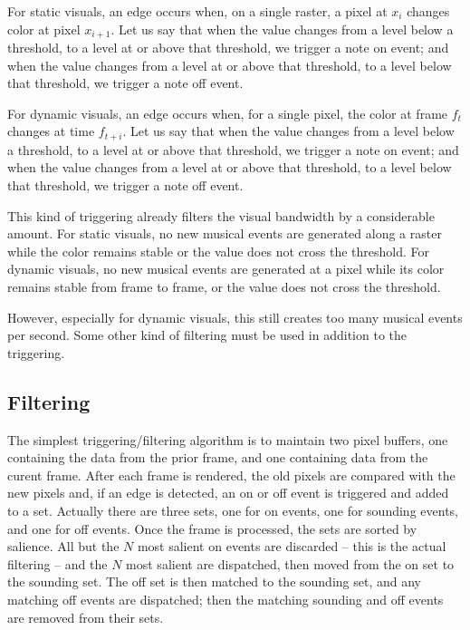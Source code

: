 \documentclass[english,11pt,letterpaper,onecolumn]{scrartcl}
\begin{document}
For static visuals, an edge occurs when, on a single raster, a pixel at 
$x_{i}$ changes color at pixel $x_{i + 1}$. Let us say that when the value 
changes from a level below a threshold, to a level at or above that threshold, 
we trigger a note on event; and when the value changes from a level at or 
above that threshold, to a level below that threshold, we trigger a note off 
event.

For dynamic visuals, an edge occurs when, for a single pixel, the color at 
frame $f_{t}$ changes at time $f_{t+i}$. Let us say that when the value 
changes from a level below a threshold, to a level at or above that threshold, 
we trigger a note on event; and when the value changes from a level at or 
above that threshold, to a level below that threshold, we trigger a note off 
event.

This kind of triggering already filters the visual bandwidth by a considerable 
amount. For static visuals, no new musical events are generated along a raster 
while the color remains stable or the value does not cross the threshold. For 
dynamic visuals, no new musical events are generated at a pixel while its 
color remains stable from frame to frame, or the value does not cross the 
threshold.

However, especially for dynamic visuals, this still creates too many musical 
events per second. Some other kind of filtering must be used in addition to 
the triggering.

\subsection{Filtering}

The simplest triggering/filtering algorithm is to maintain two pixel buffers, 
one containing the data from the prior frame, and one containing data from the 
curent frame. After each frame is rendered, the old pixels are compared with 
the new pixels and, if an edge is detected, an on or off event is triggered 
and added to a set. Actually there are three sets, one for on events, one for 
sounding events, and one for off events. Once the frame is processed, the sets 
are sorted by salience. All but the $N$ most salient on events are discarded 
-- this is the actual filtering -- and the $N$ most salient are dispatched, 
then moved from the on set to the sounding set. The off set is then matched to 
the sounding set, and any matching off events are dispatched; then the 
matching sounding and off events are removed from their sets.
\end{document}
